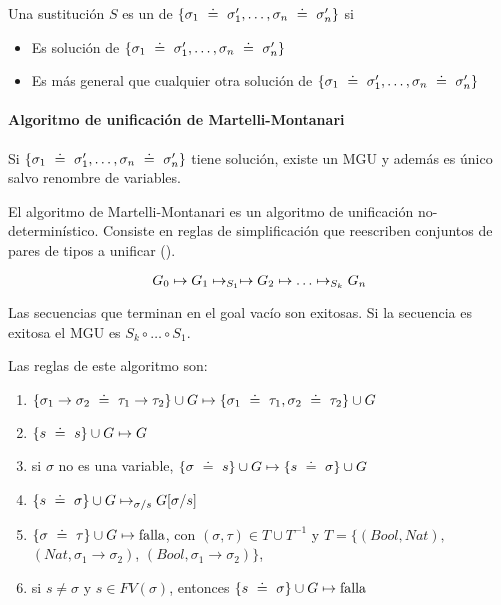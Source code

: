 Una sustitución $S$ es un  de $\{\sigma_1 \uni \sigma_1', \dots, \sigma_n \uni \sigma_n'\}$ si
\begin{itemize}
  \item Es solución de $\{\sigma_1 \uni \sigma_1', \dots, \sigma_n \uni \sigma_n'\}$
  \item Es más general que cualquier otra solución de $\{\sigma_1 \uni \sigma_1', \dots, \sigma_n \uni \sigma_n'\}$
\end{itemize}

\paragraph{Algoritmo de unificación de Martelli-Montanari}

\begin{teo}
  Si $\{\sigma_1 \uni \sigma_1', \dots, \sigma_n \uni \sigma_n'\}$ tiene solución, existe un MGU y además es único salvo renombre de variables.
\end{teo}

El algoritmo de Martelli-Montanari es un algoritmo de unificación no-determinístico. Consiste en reglas de simplificación que reescriben conjuntos de pares de tipos a unificar ().

\[G_0 \unito G_1 \unito_{S_1} \unito G_2 \unito \dots \unito_{S_k} G_n\]

Las secuencias que terminan en el goal vacío son exitosas. Si la secuencia es exitosa el MGU es $S_k \circ \dots \circ S_1$.

Las reglas de este algoritmo son:

\begin{enumerate}
  \item {} $\{\sigma_1\to\sigma_2 \uni \tau_1\to\tau_2\} \cup G \unito \{\sigma_1 \uni \tau_1, \sigma_2 \uni \tau_2\} \cup G$
  \item {} $\{s \uni s\} \cup G \unito G$
  \item {} si $\sigma$ no es una variable, $\{\sigma \uni s\} \cup G \unito \{s \uni \sigma\} \cup G$
  \item {} $\{s \uni \sigma\} \cup G \unito_{\sigma/s} G[\sigma/s]$
  \item {} $\{\sigma \uni \tau\} \cup G \unito \text{falla}$, con $(\sigma, \tau) \in T \cup T^{-1}$ y $T = \{(Bool, Nat),$ ${(Nat, \sigma_1 \to \sigma_2)}$, ${(Bool, \sigma_1 \to \sigma_2)}$$\}$,
  \item {} si $s \neq \sigma$ y $s \in FV(\sigma)$, entonces $\{s \uni \sigma\} \cup G \unito \text{falla}$
\end{enumerate}

